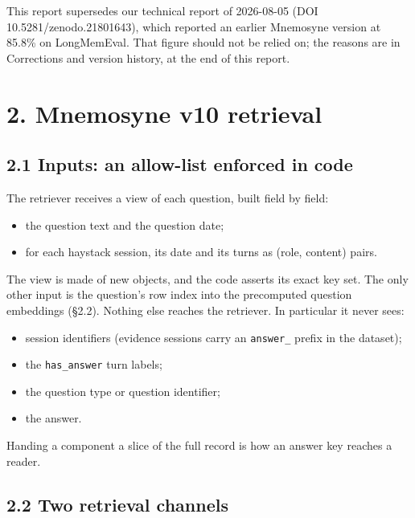 \documentclass[11pt]{article}
\providecommand{\tightlist}{\setlength{\itemsep}{0pt}\setlength{\parskip}{0pt}}
\begin{document}
This report supersedes our technical report of 2026-08-05 (DOI 10.5281/zenodo.21801643), which reported an
earlier Mnemosyne version at 85.8\% on LongMemEval. That figure should not be relied on; the reasons are in
Corrections and version history, at the end of this report.

\hypertarget{mnemosyne-v10-retrieval}{%
\section{2. Mnemosyne v10 retrieval}\label{mnemosyne-v10-retrieval}}

\hypertarget{inputs-an-allow-list-enforced-in-code}{%
\subsection{2.1 Inputs: an allow-list enforced in code}\label{inputs-an-allow-list-enforced-in-code}}

The retriever receives a view of each question, built field by field:

\begin{itemize}
\tightlist
\item
  the question text and the question date;
\item
  for each haystack session, its date and its turns as (role, content) pairs.
\end{itemize}

The view is made of new objects, and the code asserts its exact key set. The only other input is the
question's row index into the precomputed question embeddings (§2.2). Nothing else reaches the retriever. In
particular it never sees:

\begin{itemize}
\tightlist
\item
  session identifiers (evidence sessions carry an \texttt{answer\_} prefix in the dataset);
\item
  the \texttt{has\_answer} turn labels;
\item
  the question type or question identifier;
\item
  the answer.
\end{itemize}

Handing a component a slice of the full record is how an answer key reaches a reader.

\hypertarget{two-retrieval-channels}{%
\subsection{2.2 Two retrieval channels}\label{two-retrieval-channels}}
\end{document}
